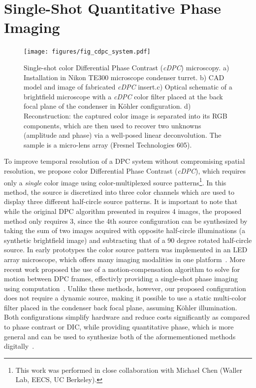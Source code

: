 \section{Single-Shot Quantitative Phase Imaging}\label{sec:phase:cdpc}

\begin{figure}[tbh]
\centering
\texttt{[image: figures/fig\_cdpc\_system.pdf]}
\caption{\label{fig:dpc_cdpchardware}
Single-shot color Differential Phase Contrast (\textit{cDPC}) microscopy. a) Installation in Nikon TE300 microscope condenser turret. b) CAD model and image of fabricated \textit{cDPC} insert.c) Optical schematic of a brightfield microscope with a \textit{cDPC} color filter placed at the back focal plane of the condenser in K\"{o}hler configuration. d) Reconstruction: the captured color image is separated into its RGB components, which are then used to recover two unknowns (amplitude and phase) via a well-posed linear deconvolution. The sample is a micro-lens array (Fresnel Technologies 605). }
\end{figure}

To improve temporal resolution of a DPC system without compromising spatial resolution, we propose color Differential Phase Contrast (\textit{cDPC}), which requires only a \emph{single} color image using color-multiplexed source patterns\footnote{This work was performed in close collaboration with Michael Chen (Waller Lab, EECS, UC Berkeley).}. In this method, the source is discretized into three color channels which are used to display three different half-circle source patterns. It is important to note that while the original DPC algorithm presented in \cite{tian2015quantitative} requires 4 images, the proposed method only requires 3, since the 4th source configuration can be synthesized by taking the sum of two images acquired with opposite half-circle illuminations (a synthetic brightfield image) and subtracting that of a 90 degree rotated half-circle source. In early prototypes the color source pattern was implemented in an LED array microscope, which offers many imaging modalities in one platform~\cite{Tian14,zijiMulti,tian2015quantitative,Ma:15,phillips2015multi, Zheng2011, Zheng2013}. More recent work proposed the use of a motion-compensation algorithm to solve for motion between DPC frames, effectivly providing a single-shot phase imaging using computation~\cite{kellman2018motion}. Unlike these methods, however, our proposed configuration does not require a dynamic source, making it possible to use a static multi-color filter placed in the condenser back focal plane, assuming K\"{o}hler illumination. Both configurations simplify hardware and reduce costs significantly as compared to phase contrast or DIC, while providing quantitative phase, which is more general and can be used to synthesize both of the aformementioned methods digitally~\cite{JMI:JMI1027}.

